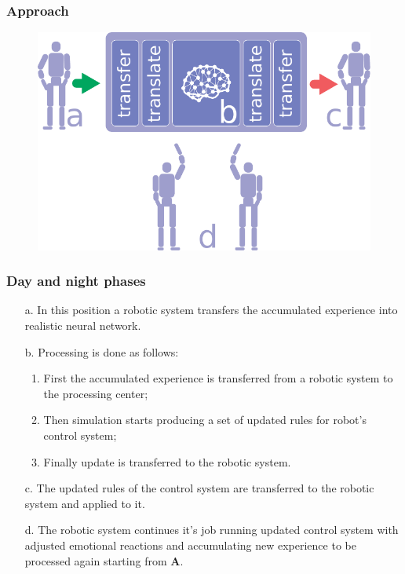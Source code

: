 \documentclass[12pt, aspectratio=169]{beamer}
\begin{document}
\begin{frame}
\frametitle{Approach}
\begin{figure}
\includegraphics[width=0.8\linewidth]{robot-dream}
\end{figure}
\end{frame}


\begin{frame}
\frametitle{Day and night phases}

\begin{enumerate}
  \item[a.] In this position a robotic system transfers the accumulated experience into realistic neural network.
  \item[b.] Processing is done as follows:
      \begin{enumerate}
      \item First the accumulated experience is transferred from a robotic system to the processing center;
      \item Then simulation starts producing a set of updated rules for robot's control system;
      \item Finally update is transferred to the robotic system.
      \end{enumerate}
  \item[c.] The updated rules of the control system are transferred to the robotic system and applied to it.
  \item[d.] The robotic system continues it's job running updated control system with adjusted emotional reactions and accumulating new experience to be processed again starting from \textbf{A}.
  \end{enumerate}

\end{frame}
\end{document}
